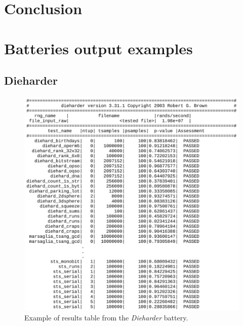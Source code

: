 \documentclass[
  digital,     %
  oneside,     %
  nosansbold,  %
  nocolorbold, %
  nolof,         %
  nolot,         %
]{fithesis4}
\begin{document}
\chapter{Conclusion}

\appendix 

\chapter{Batteries output examples} \label{append:dieharder-output}
\section{Dieharder}

\begin{figure}[H]
  \begin{center}
    \includegraphics[width=12.5cm]{figures/outputs-appendix/dieharder.jpg}
  \end{center}
  \caption{Example of results table from the \emph{Dieharder} battery.}
  \label{fig:die_out}
\end{figure}

\pagebreak
\end{document}
